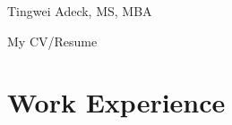 \documentclass[
	10pt, %
]{FreemanCV_MOD}
\begin{document}
\begin{paracol}{2} %


\parbox[][0.11\textheight][c]{\linewidth}{ %
	\centering %
	
	{\sffamily\Huge Tingwei Adeck, MS, MBA} %
	
	
	{\cursivefont\Huge\textcolor{headings}{My CV/Resume}}
	
	\vfill %
}






\section{Work Experience}{\faAlignJustify}



	

\end{paracol}
\end{document}
